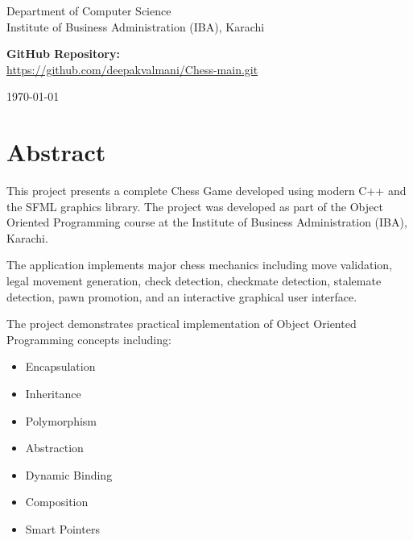 \documentclass[11pt]{article}
\begin{document}
\begin{titlepage}
\vfill

{\large
Department of Computer Science \\
Institute of Business Administration (IBA), Karachi
}

\vspace{0.8cm}

{\large
\textbf{GitHub Repository:} \\
\url{https://github.com/deepakvalmani/Chess-main.git}
}
\vspace{0.8cm}

{\large \today}

\end{titlepage}


\tableofcontents
\newpage


\section{Abstract}

This project presents a complete Chess Game developed using modern C++ and the SFML graphics library. The project was developed as part of the Object Oriented Programming course at the Institute of Business Administration (IBA), Karachi.

The application implements major chess mechanics including move validation, legal movement generation, check detection, checkmate detection, stalemate detection, pawn promotion, and an interactive graphical user interface.

The project demonstrates practical implementation of Object Oriented Programming concepts including:

\begin{itemize}
    \item Encapsulation
    \item Inheritance
    \item Polymorphism
    \item Abstraction
    \item Dynamic Binding
    \item Composition
    \item Smart Pointers
\end{itemize}
\end{document}
